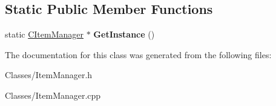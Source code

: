 \subsection*{Static Public Member Functions}
\begin{DoxyCompactItemize}
\item 
static \hyperlink{class_c_item_manager}{C\+Item\+Manager} $\ast$ {\bfseries Get\+Instance} ()\hypertarget{class_c_item_manager_a85451cfc18780bf97b932d3f22328afe}{}\label{class_c_item_manager_a85451cfc18780bf97b932d3f22328afe}

\end{DoxyCompactItemize}


The documentation for this class was generated from the following files\+:\begin{DoxyCompactItemize}
\item 
Classes/Item\+Manager.\+h\item 
Classes/Item\+Manager.\+cpp\end{DoxyCompactItemize}
